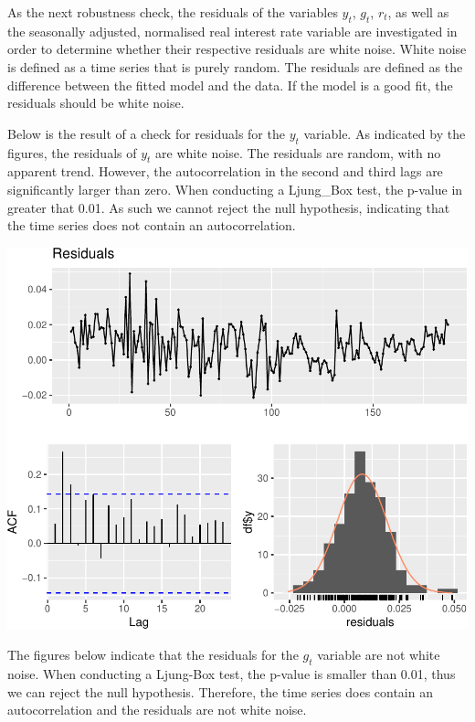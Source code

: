 \documentclass[11pt,preprint, authoryear]{elsarticle}
\numberwithin{equation}{section}
\numberwithin{figure}{section}
\numberwithin{table}{section}
\begin{document}
As the next robustness check, the residuals of the variables \(y_t\),
\(g_t\), \(r_t\), as well as the seasonally adjusted, normalised real
interest rate variable are investigated in order to determine whether
their respective residuals are white noise. White noise is defined as a
time series that is purely random. The residuals are defined as the
difference between the fitted model and the data. If the model is a good
fit, the residuals should be white noise.

\newpage

Below is the result of a check for residuals for the \(y_t\) variable.
As indicated by the figures, the residuals of \(y_t\) are white noise.
The residuals are random, with no apparent trend. However, the
autocorrelation in the second and third lags are significantly larger
than zero. When conducting a Ljung\_Box test, the p-value in greater
that 0.01. As such we cannot reject the null hypothesis, indicating that
the time series does not contain an autocorrelation.

\includegraphics{TS_proj_files/figure-latex/unnamed-chunk-24-1.pdf}

\newpage

The figures below indicate that the residuals for the \(g_t\) variable
are not white noise. When conducting a Ljung-Box test, the p-value is
smaller than 0.01, thus we can reject the null hypothesis. Therefore,
the time series does contain an autocorrelation and the residuals are
not white noise.
\end{document}
